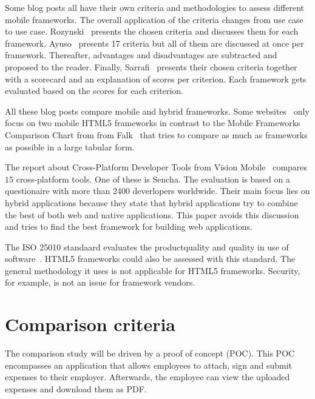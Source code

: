 \documentclass[a4paper]{artikel3}
\begin{document}
Some blog posts \cite{Sarrafi2012a,Ayuso2012,Rozynski2011} all have their own criteria and methodologies to assess different mobile frameworks.  
The overall application of the criteria changes from use case to use case.  
Rozynski~\cite{Rozynski2011} presents the chosen criteria and discusses them for each framework.  
Ayuso~\cite{Ayuso2012} presents 17 criteria but all of them are discussed at once per framework.  
Thereafter,  advantages and disadvantages are subtracted and proposed to the reader.  
Finally, Sarrafi~\cite{Sarrafi2012a} presents their chosen criteria together with a scorecard and an explanation of scores per criterion.  
Each framework gets evaluated based on the scores for each criterion.

All these blog posts compare mobile and hybrid frameworks.  
Some websites~\cite{Bristowe2012,Burris} only focus on two mobile HTML5 frameworks in contrast to the Mobile Frameworks Comparison Chart from from Falk~\cite{Falk2011} that tries to compare as much as frameworks as possible in a large tabular form.

The report about Cross-Platform Developer Tools from Vision Mobile~\cite{Mobile2012} compares $15$ cross-platform tools.
One of these is Sencha.
The evaluation is based on a questionaire with more than 2400 deverlopers worldwide.
Their main focus lies on hybrid applications because they state that hybrid applications try to combine the best of both web and native applications.
This paper avoids this discussion and tries to find the best framework for building web applications.

The ISO 25010 standaard evaluates the productquality and quality in use of software~\cite{Standard2010}.
HTML5 frameworks could also be assessed with this standard.
The general methodology it uses is not applicable for HTML5 frameworks.
Security,  for example,  is not an issue for framework vendors.



\section{Comparison criteria} %
\label{sec:comparisoncriteria}


The comparison study will be driven by a proof of concept (POC).  
This POC encompasses an application that allows employees to attach, sign and submit expenses to their employer.
Afterwards, the employee can view the uploaded expenses and download them as PDF.
\end{document}
